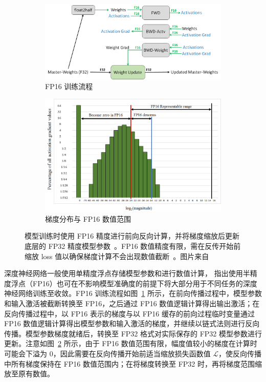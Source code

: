 \documentclass[
  fontset = mac,
]{shtthesis}
\begin{document}
\begin{figure}[htb]
  \centering
  \begin{subfigure}[t]{0.45\columnwidth}
    \centering
    \includegraphics[width=\columnwidth]{img/Background/mixed_prec_iteration.png}
    \caption{FP16 训练流程}
    \label{img::background::fp16_ops}
  \end{subfigure}
  \quad
  \begin{subfigure}[t]{0.45\columnwidth}
    \centering
    \includegraphics[width=\columnwidth]{img/Background/ssd_ag_log_histo_coarse.png}
    \caption{梯度分布与 FP16 数值范围}
    \label{img::background::fp16_grads}
  \end{subfigure}
  \caption{模型训练时使用 FP16 精度进行前向反向计算，并将梯度缩放后更新底层的 FP32 精度模型参数~。FP16 数值精度有限，需在反传开始前缩放 loss 值以确保梯度计算不会出现数值截断~。图片来自~\citet{micikevicius2018mixed}}
  \label{img::background::fp16_training}
\end{figure}

深度神经网络一般使用单精度浮点存储模型参数和进行数值计算，\citet{micikevicius2018mixed} 指出使用半精度浮点（FP16）也可在不影响模型准确度的前提下将大部分用于不同任务的深度神经网络训练至收敛。FP16 训练流程如图~\ref{img::background::fp16_ops} 所示，在前向传播过程中，模型参数和输入激活被截断转换至 FP16，之后通过 FP16 数值逻辑计算得出输出激活；在反向传播过程中，以 FP16 表示的梯度与以 FP16 缓存的前向过程临时变量通过 FP16 数值逻辑计算得出模型参数和输入激活的梯度，并继续以链式法则进行反向传播。模型参数梯度就绪后，转换至 FP32 格式对实际保存的 FP32 模型参数进行更新。注意如图~\ref{img::background::fp16_grads} 所示，由于 FP16 数值范围有限，幅度值较小的梯度在计算时可能会下溢为 0，因此需要在反向传播开始前适当缩放损失函数值 $\mathcal{L}$，使反向传播中所有梯度保持在 FP16 数值范围内；在将梯度转换至 FP32 时，再将梯度范围缩放至原有数值。
\end{document}
